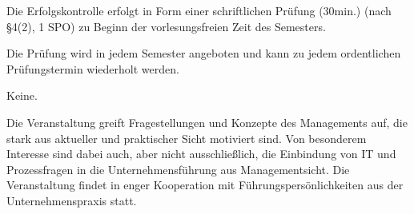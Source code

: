 \begin{course}

\setdoclanguagegerman
{}



\coursehead


\label{cour_5977.dp_997}


\begin{styleenv}
\begin{assessment}
Die Erfolgskontrolle erfolgt in Form einer schriftlichen Prüfung (30min.) (nach §4(2), 1 SPO) zu Beginn der vorlesungsfreien Zeit des Semesters.

 

Die Prüfung wird in jedem Semester angeboten und kann zu jedem ordentlichen Prüfungstermin wiederholt werden.


\end{assessment}

\begin{conditions}Keine.\end{conditions}


\end{styleenv}

\begin{learningoutcomes}
Die Veranstaltung greift Fragestellungen und Konzepte des Managements auf, die stark aus aktueller und praktischer Sicht motiviert sind. Von besonderem Interesse sind dabei auch, aber nicht ausschließlich, die Einbindung von IT und Prozessfragen in die Unternehmensführung aus Managementsicht. Die Veranstaltung findet in enger Kooperation mit Führungspersönlichkeiten aus der Unternehmenspraxis statt.



\end{learningoutcomes}
\end{course}

